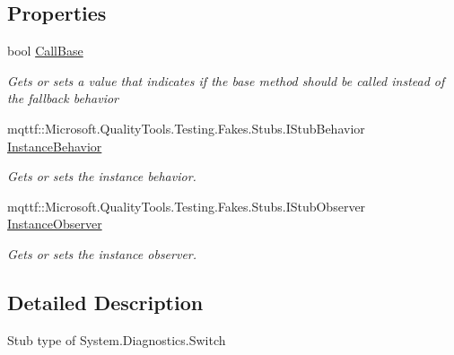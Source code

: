 \subsection*{Properties}
\begin{DoxyCompactItemize}
\item 
bool \hyperlink{class_system_1_1_diagnostics_1_1_fakes_1_1_stub_switch_a30af35a53f3c20bc95e0f27b0e2be920}{Call\-Base}
\begin{DoxyCompactList}\small\item\em Gets or sets a value that indicates if the base method should be called instead of the fallback behavior\end{DoxyCompactList}\item 
mqttf\-::\-Microsoft.\-Quality\-Tools.\-Testing.\-Fakes.\-Stubs.\-I\-Stub\-Behavior \hyperlink{class_system_1_1_diagnostics_1_1_fakes_1_1_stub_switch_a4229102eb0e757ef7444c04889f0f2e5}{Instance\-Behavior}
\begin{DoxyCompactList}\small\item\em Gets or sets the instance behavior.\end{DoxyCompactList}\item 
mqttf\-::\-Microsoft.\-Quality\-Tools.\-Testing.\-Fakes.\-Stubs.\-I\-Stub\-Observer \hyperlink{class_system_1_1_diagnostics_1_1_fakes_1_1_stub_switch_aae12862da96176cc2cb376d5f3398077}{Instance\-Observer}
\begin{DoxyCompactList}\small\item\em Gets or sets the instance observer.\end{DoxyCompactList}\end{DoxyCompactItemize}


\subsection{Detailed Description}
Stub type of System.\-Diagnostics.\-Switch



